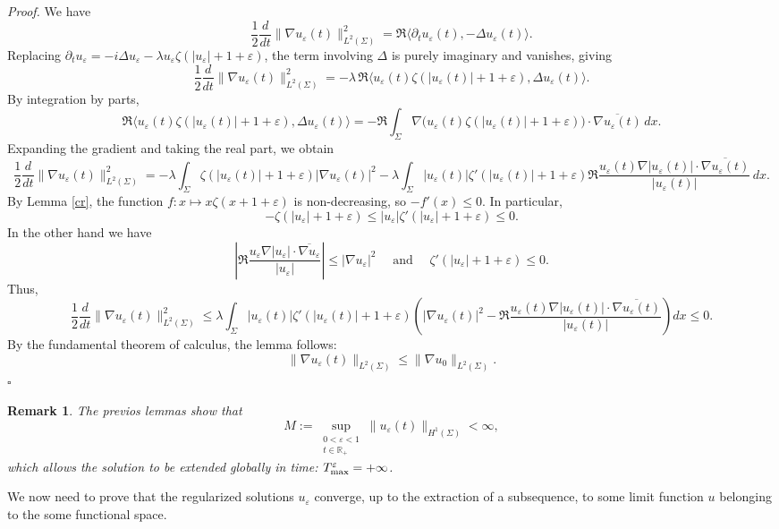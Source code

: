 \documentclass[10pt]{article}
\newtheorem{remark}[theorem]{Remark}
\renewenvironment{proof}[1][Proof]{%
  \noindent\textit{#1. }%
}{\hfill$\square$\vspace{4pt}}
\begin{document}
\begin{proof}We have
\[
\frac{1}{2} \frac{d}{dt} \|\nabla u_\varepsilon(t)\|_{L^2(\Sigma)}^2
= \Re \langle \partial_t u_\varepsilon(t), -\Delta u_\varepsilon(t) \rangle.
\]
Replacing $\partial_t u_\varepsilon = -i \Delta u_\varepsilon - \lambda u_\varepsilon \zeta(|u_\varepsilon|+1+\varepsilon)$, the term involving $\Delta$ is purely imaginary and vanishes, giving
\[
\frac{1}{2} \frac{d}{dt} \|\nabla u_\varepsilon(t)\|_{L^2(\Sigma)}^2
= -\lambda \, \Re \langle u_\varepsilon(t) \zeta(|u_\varepsilon(t)|+1+\varepsilon), \Delta u_\varepsilon(t) \rangle.
\]
By integration by parts,
\[
\Re \langle u_\varepsilon(t) \zeta(|u_\varepsilon(t)|+1+\varepsilon), \Delta u_\varepsilon(t) \rangle
= - \Re\int_\Sigma \nabla \big( u_\varepsilon(t) \zeta(|u_\varepsilon(t)|+1+\varepsilon) \big) \cdot \overline{\nabla u_\varepsilon(t)} \, dx.
\]
Expanding the gradient and taking the real part, we obtain
\begin{equation}\label{10}
    \frac{1}{2} \frac{d}{dt} \|\nabla u_\varepsilon(t)\|_{L^2(\Sigma)}^2
= -\lambda \int_\Sigma \zeta(|u_\varepsilon(t)|+1+\varepsilon) |\nabla u_\varepsilon(t)|^2
- \lambda \int_\Sigma |u_\varepsilon(t)| \zeta'(|u_\varepsilon(t)|+1+\varepsilon) \Re \frac{u_\varepsilon(t) \nabla |u_\varepsilon(t)| \cdot \overline{\nabla u_\varepsilon(t)}}{|u_\varepsilon(t)|} \, dx.
\end{equation}
By Lemma \ref{cr}, the function $f:x \mapsto x \zeta(x+1+\varepsilon)$ is non-decreasing, so $-f'(x) \le 0$. In particular,
\[
-\zeta(|u_\varepsilon|+1+\varepsilon)\leq|u_\varepsilon| \zeta'(|u_\varepsilon|+1+\varepsilon)\leq 0.
\]
In the other hand we have \[
\left| \Re \frac{u_\varepsilon \nabla |u_\varepsilon| \cdot \overline{\nabla u_\varepsilon}}{|u_\varepsilon|} \right| \le |\nabla u_\varepsilon|^2\quad \text{ and } \quad \zeta'(|u_\varepsilon|+1+\varepsilon) \le 0.
\]
Thus,
\[
\frac{1}{2} \frac{d}{dt} \|\nabla u_\varepsilon(t)\|_{L^2(\Sigma)}^2 
\le \lambda \int_\Sigma |u_\varepsilon(t)| \zeta'(|u_\varepsilon(t)|+1+\varepsilon) \left( |\nabla u_\varepsilon(t)|^2 - \Re \frac{ u_\varepsilon(t)\nabla |u_\varepsilon(t)| \cdot \overline{\nabla u_\varepsilon(t)}}{|u_\varepsilon(t)|} \right) dx \le 0.
\]
By the fundamental theorem of calculus, the lemma follows:
\[
\|\nabla u_\varepsilon(t)\|_{L^2(\Sigma)} \le \|\nabla u_0\|_{L^2(\Sigma)}.
\]
\end{proof}
\begin{remark}
The previos lemmas show that
\begin{equation}\label{nt}
    M:=\sup_{\substack{0<\varepsilon<1 \\ t\in \mathbb{R}_+}}\|u_\varepsilon(t)\|_{H^1(\Sigma)} <\infty,
\end{equation}
which allows the solution to be extended globally in time: $T_{\rm max}^{\varepsilon} = +\infty$.
\end{remark}
We now need to prove that the regularized solutions $u_\varepsilon$ converge, up to the extraction
of a subsequence, to some limit function $u$ belonging to the some functional space.
 
\end{document}
